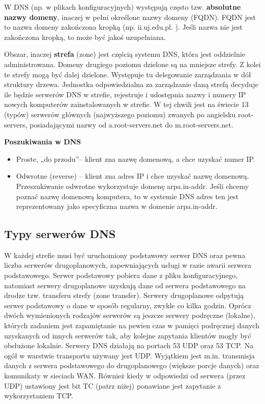 \documentclass[a4paper]{article}
\begin{document}
W DNS (np. w plikach konfiguracyjnych) występują często tzw. \textbf{absolutne nazwy domeny},
inaczej w pełni określone nazwy domeny (FQDN). FQDN jest to nazwa domeny zakończona kropką (np. ii.uj.edu.pl. ). Jeśli nazwa nie
jest zakończona kropką, to może być jakoś uzupełniana.

Obszar, inaczej \textbf{strefa} (zone) jest częścią systemu DNS, która jest oddzielnie administrowana.
Domeny drugiego poziomu dzielone są na mniejsze strefy. Z kolei te strefy mogą być dalej
dzielone. Występuje tu delegowanie zarządzania w dół struktury drzewa. Jednostka
odpowiedzialna za zarządzanie daną strefą decyduje ile będzie serwerów DNS w strefie,
rejestruje i udostępnia nazwy i numery IP nowych komputerów zainstalowanych w strefie.
W tej chwili jest na świecie 13 (typów) serwerów głównych (najwyższego poziomu) zwanych
po angielsku root-servers, posiadającymi nazwy od a.root-servers.net do m.root-servers.net.

\textbf{Poszukiwania w DNS}
\begin{itemize}
\item Proste, „do przodu”– klient zna nazwę domenową, a chce uzyskać numer IP.
\item Odwrotne (reverse) – klient zna adres IP i chce uzyskać nazwę domenową.
Przeszukiwanie odwrotne wykorzystuje domenę arpa.in-addr. Jeśli chcemy
poznać nazwę domenową komputera, to w systemie DNS adres ten
jest reprezentowany jako specyficzna nazwa w domenie arpa.in-addr.
\end{itemize}

\subsection{Typy serwerów DNS}
W każdej strefie musi być uruchomiony podstawowy serwer DNS oraz pewna liczba
serwerów drugoplanowych, zapewniających usługi w razie awarii serwera podstawowego.
Serwer podstawowy pobiera dane z pliku konfiguracyjnego, natomiast serwery
drugoplanowe uzyskują dane od serwera podstawowego na drodze tzw. transferu strefy
(zone transfer). Serwery drugoplanowe odpytują serwer podstawowy o dane w sposób
regularny, zwykle co kilka godzin. Oprócz dwóch wymienionych rodzajów serwerów są
jeszcze serwery podręczne (lokalne), których zadaniem jest zapamiętanie na pewien czas w
pamięci podręcznej danych uzyskanych od innych serwerów tak, aby kolejne zapytania
klientów mogły być obsłużone lokalnie.
Serwery DNS działają na portach 53 UDP oraz 53 TCP. Na ogół w warstwie transportu
używany jest UDP. Wyjątkiem jest m.in. transmisja danych z serwera podstawowego do
drugoplanowego (większe porcje danych) oraz komunikaty w sieciach WAN. Również kiedy w 
odpowiedzi od serwera (przez UDP) ustawiony jest bit TC (patrz niżej) ponawiane jest
zapytanie z wykorzystaniem TCP.
\end{document}
